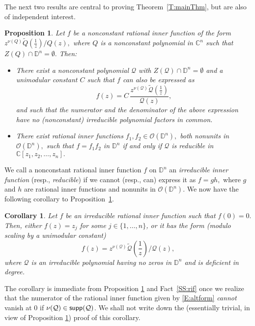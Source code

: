 \documentclass[11pt, reqno]{amsart}
\numberwithin{equation}{section}
\theoremstyle{definition}
\theoremstyle{remark}
\theoremstyle{plain}
\newtheorem{proposition}[definition]{Proposition}
\newtheorem{corollary}[definition]{Corollary}
\begin{document}
The next two results are central to proving Theorem~\ref{T:mainThm}, but are also of independent interest.

\begin{proposition}\label{P:factprop}
Let $f$ be a nonconstant rational inner function of the form
${z^{\nu(Q)}\widetilde{Q}(\frac{1}{z})}/{Q(z)},$ where
$Q$ is a nonconstant polynomial in ${\mathbb{C}^n}$ such that $Z(Q)\cap{\mathbb{D}}^n=\emptyset.$ Then:
\begin{itemize}
\item[$(a)$] There exist a nonconstant polynomial ${\mathcal{Q}}$ with $Z({\mathcal{Q}})\cap{\mathbb{D}}^n=\emptyset$
and a unimodular constant $C$ such that $f$ can also be expressed as
\begin{equation}
 f(z) = C\,\frac{z^{\nu({\mathcal{Q}})}\widetilde{\mathcal{Q}}(\frac{1}{z})}{{\mathcal{Q}}(z)}, \label{E:altform}
\end{equation}
and such that the numerator and the denominator of the above expression have no (nonconstant) irreducible
polynomial factors in common.

\item[$(b)$] There exist rational
inner functions $f_1,f_2\in{\mathcal{O}}({\mathbb{D}}^n),$ both nonunits in ${\mathcal{O}}({\mathbb{D}}^n),$
such that $f=f_1f_2$ in ${\mathbb{D}}^n$ if and only if ${\mathcal{Q}}$ is reducible in ${\mathbb{C}}[z_1,z_2,\ldots,z_n].$ 
\end{itemize}
\end{proposition}
\smallskip

We call a nonconstant rational inner function $f$ on ${\mathbb{D}}^n$ an {\em irreducible inner function} (resp., {\em reducible})
if we cannot (resp., can) express it as $f=gh,$ where $g$ and $h$ are rational inner functions and nonunits
in ${\mathcal{O}}({\mathbb{D}}^n).$
We now have the following corollary to Proposition~\ref{P:factprop}.

\begin{corollary}\label{C:irdefpol}
Let $f$ be an irreducible rational inner function such that $f(0)=0.$ Then, either
 $f(z) = z_j$ for some $j\in \{1,\dots, n\}$, or it has the form (modulo scaling by a unimodular constant)
\[
 f(z) = z^{\nu({\mathcal{Q}})}\widetilde{\mathcal{Q}}\left(\frac{1}{z}\right)\big/{\mathcal{Q}}(z),
\]
where ${\mathcal{Q}}$ is an irreducible polynomial having no zeros in ${\mathbb{D}}^n$ and is deficient in degree.
\end{corollary}
\smallskip

The corollary is immediate from Proposition \ref{P:factprop} and Fact~\ref{SS:rif} 
once we realize that the numerator of the rational inner function given by \eqref{E:altform}
{\em cannot} vanish at $0$ if $\nu({\mathcal{Q}})\in {\sf supp}({\mathcal{Q}})$.
We shall not write down the (essentially trivial, in view of Proposition \ref{P:factprop}) proof of this
corollary.
\smallskip
\end{document}
